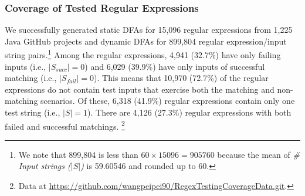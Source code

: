 
\subsubsection{Coverage of Tested Regular Expressions}
We successfully generated static DFAs for 15,096 regular expressions from 1,225 Java GitHub projects  and dynamic DFAs for 899,804 regular expression/input string pairs.\footnote{We note that 899,804 is less than $60 \times 15096 = 905760$ because the mean of {\em\# Input strings ($\lvert S \rvert$)} is 59.60546 and rounded up to 60.} %
Among the regular expressions, 4,941 (32.7\%)   have only failing inputs (i.e., $\lvert S_{succ} \rvert = 0$) and 6,029 (39.9\%) have only inputs of successful matching (i.e.,  $\lvert S_{fail} \rvert = 0$). This means that 10,970 (72.7\%) of the regular expressions do not contain test inputs that exercise both the matching and non-matching scenarios. Of these, 6,318 (41.9\%) regular expressions contain only one test string (i.e., $\lvert S \rvert = 1$). There are  4,126 (27.3\%) regular expressions with both failed and successful matchings. \footnote{Data at \url{https://github.com/wangpeipei90/RegexTestingCoverageData.git}.}

